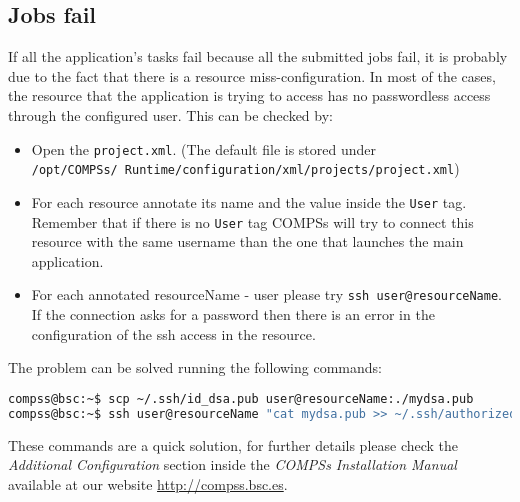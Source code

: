 \subsection{Jobs fail}
If all the application's tasks fail because all the submitted jobs fail, it is probably due to the fact that there is a resource 
miss-configuration. In most of the cases, the resource that the application is trying to access has no passwordless access through
the configured user. This can be checked by:
\begin{itemize}
 \item Open the \texttt{project.xml}. (The default file is stored under \\ \texttt{/opt/COMPSs/
 Runtime/configuration/xml/projects/project.xml})
 \item For each resource annotate its name and the value inside the \texttt{User} tag. Remember that if there is no \texttt{User}
 tag COMPSs will try to connect this resource with the same username than the one that launches the main application.
 \item For each annotated resourceName - user please try \texttt{ssh user@resourceName}. If the connection asks for a password then
 there is an error in the configuration of the ssh access in the resource.
\end{itemize}

The problem can be solved running the following commands:
\begin{lstlisting}[language=bash]
compss@bsc:~$ scp ~/.ssh/id_dsa.pub user@resourceName:./mydsa.pub
compss@bsc:~$ ssh user@resourceName "cat mydsa.pub >> ~/.ssh/authorized_keys; rm ./mydsa.pub"
\end{lstlisting}

These commands are a quick solution, for further details please check the \textit{Additional Configuration} section 
inside the \textit{COMPSs Installation Manual} available at our website \url{http://compss.bsc.es}.

